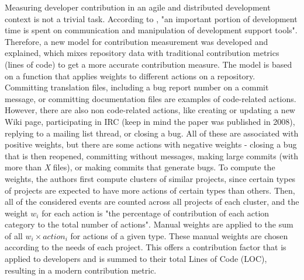 Measuring developer contribution in an agile and distributed development context is not a trivial task. According to \cite{Gousios_2008}, "an important portion of development time is spent on communication and manipulation of development support tools". Therefore, a new model for contribution measurement was developed and explained, which mixes repository data with traditional contribution metrics (lines of code) to get a more accurate contribution measure. The model is based on a function that applies weights to different actions on a repository. Committing translation files, including a bug report number on a commit message, or committing documentation files are examples of code-related actions. However, there are also non code-related actions, like creating or updating a new Wiki page, participating in IRC (keep in mind the paper was published in 2008), replying to a mailing list thread, or closing a bug. All of these are associated with positive weights, but there are some actions with negative weights - closing a bug that is then reopened, committing without messages, making large commits (with more than \textit{X} files), or making commits that generate bugs. To compute the weights, the authors first compute clusters of similar projects, since certain types of projects are expected to have more actions of certain types than others. Then, all of the considered events are counted across all projects of each cluster, and the weight $w_i$ for each action is "the percentage of contribution of each action category to the total number of actions". Manual weights are applied to the sum of all $w_i \times action_i$ for actions of a given type. These manual weights are chosen according to the needs of each project. This offers a contribution factor that is applied to developers and is summed to their total Lines of Code (LOC), resulting in a modern contribution metric.



